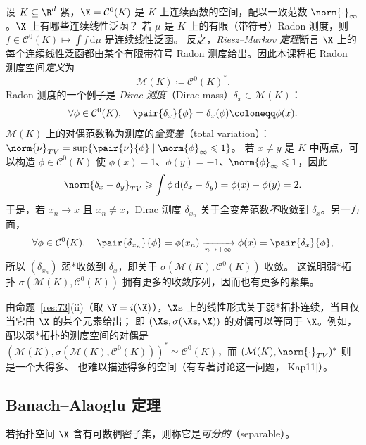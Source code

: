 \begin{example}[测度]
\label{exa:28}
设 $K\subseteq\R^d$ 紧，$\X=\mathcal{C}^0(K)$ 是 $K$ 上连续函数的空间，配以一致范数 $\norm{\cdot}_\infty$。$\X$ 上有哪些连续线性泛函？
若 $\mu$ 是 $K$ 上的有限（带符号）Radon 测度，则 $f\in\mathcal{C}^0(K)\mapsto\int f\,\mathrm{d}\mu$ 是连续线性泛函。
反之，\emph{Riesz--Markov 定理}断言 $\X$ 上的每个连续线性泛函都由某个有限带符号 Radon 测度给出。因此本课程把 Radon 测度空间\emph{定义}为
\[
  \mathcal{M}(K)\coloneqq\mathcal{C}^0(K)^* .
\]
Radon 测度的一个例子是 \emph{Dirac 测度}（Dirac mass）$\delta_x\in\mathcal{M}(K)$：
\[
  \forall\phi\in\mathcal{C}^0(K),\quad\pair{\delta_x}{\phi}=\delta_x(\phi)\coloneqq\phi(x).
\]
$\mathcal{M}(K)$ 上的对偶范数称为测度的\emph{全变差}（total variation）：$\norm{\nu}_{TV}=\sup\{\pair{\nu}{\phi}\mid\norm{\phi}_\infty\leqslant1\}$。
若 $x\neq y$ 是 $K$ 中两点，可以构造 $\phi\in\mathcal{C}^0(K)$ 使 $\phi(x)=1$、$\phi(y)=-1$、$\norm{\phi}_\infty\leqslant1$，因此
\[
  \norm{\delta_x-\delta_y}_{TV}\geqslant\int\phi\,\mathrm{d}(\delta_x-\delta_y)=\phi(x)-\phi(y)=2 .
\]
于是，若 $x_n\to x$ 且 $x_n\neq x$，Dirac 测度 $\delta_{x_n}$ 关于全变差范数\emph{不}收敛到 $\delta_x$。另一方面，
\[
  \forall\phi\in\mathcal{C}^0(K),\quad\pair{\delta_{x_n}}{\phi}=\phi(x_n)\xrightarrow[n\to+\infty]{}\phi(x)=\pair{\delta_x}{\phi},
\]
所以 $(\delta_{x_n})$ 弱*收敛到 $\delta_x$，即关于 $\sigma(\mathcal{M}(K),\mathcal{C}^0(K))$ 收敛。
这说明弱*拓扑 $\sigma(\mathcal{M}(K),\mathcal{C}^0(K))$ 拥有更多的收敛序列，因而也有更多的紧集。
\end{example}

\begin{remark}
\label{rem:31}
由命题~\ref{res:73}(ii)（取 $\Y=i(\X)$），$\Xs$ 上的线性形式关于弱*拓扑连续，当且仅当它由 $\X$ 的某个元素给出；
即 $(\Xs,\sigma(\Xs,\X))$ 的对偶可以等同于 $\X$。例如，配以弱*拓扑的测度空间的对偶是
$(\mathcal{M}(K),\sigma(\mathcal{M}(K),\mathcal{C}^0(K)))^*\simeq\mathcal{C}^0(K)$，而 $(\mathcal{M}(K),\norm{\cdot}_{TV})^*$ 则是一个大得多、
也难以描述得多的空间（有专著讨论这一问题，[Kap11]）。
\end{remark}

\subsection{Banach--Alaoglu 定理}

\begin{definition}[可分性]
\label{def:40}
若拓扑空间 $\X$ 含有可数稠密子集，则称它是\emph{可分的}（separable）。
\end{definition}

